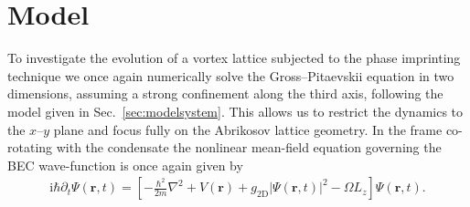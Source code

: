 \section{Model}\label{sec:model}

To investigate the evolution of a vortex lattice subjected to the phase imprinting technique we once again numerically solve the Gross--Pitaevskii equation in two dimensions, assuming a strong confinement along the third axis, following the model given in Sec.~\ref{sec:modelsystem}. This allows us to restrict the dynamics to the $x$--$y$ plane and focus fully on the Abrikosov lattice geometry. In the frame co-rotating with the condensate the nonlinear mean-field equation governing the BEC wave-function is once again given by
\begin{align}
    \textrm{i}\hbar\partial_t \Psi(\mathbf{r},t) = \left[-\frac{\hbar^2}{2m}\nabla^2 + V\left(\mathbf{r}\right)
	+ g_{\textrm{2D}}\vert \Psi(\mathbf{r},t) \vert^2- \Omega L_z \right]\Psi(\mathbf{r},t).
\end{align}

